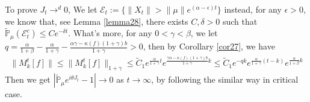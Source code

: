 \documentclass[12pt,oneside,english]{amsart}
\theoremstyle{plain}
\theoremstyle{definition}
\numberwithin{equation}{section}
\begin{document}
To prove $J_t\rightarrow^d 0$, We let $\mathcal{E}_t:=\{\|X_t\|>\|\mu\|e^{(\alpha-\epsilon )t}\}$ instead, for any $\epsilon>0$, we know that, see Lemma \ref{lemma28}, there exists
$C,\delta >0$ such that  $\mathbb{\tilde{P}}_{\mu}(\mathcal{E}_t^c)\leq C e^{-\delta t}$. What's more, for any $0< \gamma <\beta$, we let $q=\frac{\alpha}{1+\beta}-\frac{\alpha}{1+\gamma} - \frac{\alpha\gamma-\kappa(f)(1+\gamma)b}{1+\gamma}>0$, then by Corollary \ref{cor27}, we have
\begin{align*}
    \|M_k^t[f]\|\leq \|M_k^t[f]\|_{1+\gamma}\leq \tilde{C}_1 e^{\frac{\alpha}{1+\gamma}t}e^{\frac{\gamma \alpha-\kappa(f)(1+\gamma)b}{1+\gamma}k}\leq \tilde{C}_1 e^{-qk}e^{\frac{\alpha}{1+\gamma}(t-k)}e^{\frac{\alpha}{1+\beta}k}
\end{align*}
Then we get $  \left|\mathbb{\tilde{P}}_{\mu}e^{i\theta J_t}-1\right|\rightarrow 0$ as $ t\rightarrow \infty$, by following the similar way in critical case.

\appendix
\section{}
\end{document}
